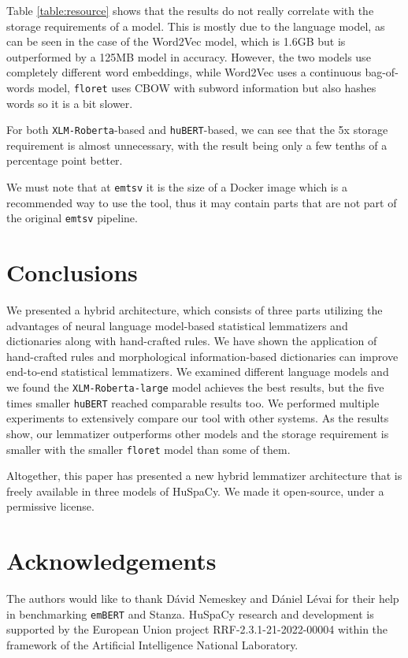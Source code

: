 \documentclass{llncs}
\newcommand{\embert}{\texttt{emBERT}}
\newcommand{\emtsv}{\texttt{emtsv}}
\newcommand{\floret}{\texttt{floret}}
\newcommand{\hubert}{\texttt{huBERT}}
\newcommand{\xlmroberta}{\texttt{XLM-Roberta}}
\newcommand{\stanza}{Stanza}
\begin{document}
Table \ref{table:resource} shows that the results do not really correlate with the storage requirements of a model. This is mostly due to the language model, as can be seen in the case of the Word2Vec model, which is 1.6GB but is outperformed by a 125MB model in accuracy. However, the two models use completely different word embeddings, while Word2Vec uses a continuous bag-of-words model, \floret{} uses CBOW with subword information but also hashes words so it is a bit slower. 

For both \xlmroberta-based and \hubert-based, we can see that the 5x storage requirement is almost unnecessary, with the result being only a few tenths of a percentage point better.

We must note that at \emtsv{} it is the size of a Docker image which is a recommended way to use the tool, thus it may contain parts that are not part of the original \emtsv{} pipeline.

\section{Conclusions}

We presented a hybrid architecture, which consists of three parts utilizing the advantages of neural language model-based statistical lemmatizers and dictionaries along with hand-crafted rules. We have shown the application of hand-crafted rules and morphological information-based dictionaries can improve end-to-end statistical lemmatizers. We examined different language models and we found the \xlmroberta\texttt{-large} model achieves the best results, but the five times smaller \hubert{} reached comparable results too.  We performed multiple experiments to extensively compare our tool with other systems. As the results show, our lemmatizer outperforms other models and the storage requirement is smaller with the smaller \floret{} model than some of them. 

Altogether, this paper has presented a new hybrid lemmatizer architecture that is freely available in three models of HuSpaCy. We made it open-source, under a permissive license.












\section*{Acknowledgements}
The authors would like to thank Dávid Nemeskey and Dániel Lévai for their help in benchmarking \embert{} and \stanza{}.
HuSpaCy research and development is supported by the European Union project RRF-2.3.1-21-2022-00004 within the framework of the Artificial Intelligence National Laboratory.

%
\renewcommand\bibname{\refname}
\renewcommand\bibname{References}


\end{document}
